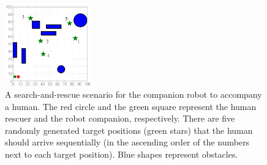 \documentclass[journal]{IEEEtran}
\DeclareRobustCommand{\clnote}[1]{\ifthenelse{\boolean{include-notes}}%
{\textcolor{orange}{\textbf{CL: #1}}}{}}
\begin{document}
\begin{figure}
		\centering		
		\includegraphics[width=0.33\textwidth]{figures/map}		
		\caption{A search-and-rescue scenario for the companion robot to accompany a human. The red circle and the green square represent the human rescuer and the robot companion, respectively. There are five randomly generated target positions (green stars) that the human should arrive sequentially (in the ascending order of the numbers next to each target position). Blue shapes represent obstacles.}
		\label{fig:ref_traj_init}
	\end{figure}

\end{document}
